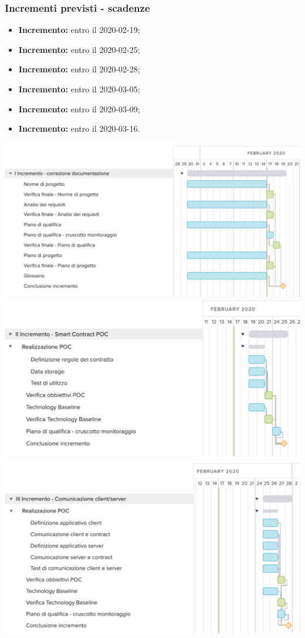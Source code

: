 \subsubsection{Incrementi previsti - scadenze}
\begin{itemize}
	\item \textbf{ Incremento:} entro il 2020-02-19;
	\item \textbf{ Incremento:} entro il 2020-02-25;
	\item \textbf{ Incremento:} entro il 2020-02-28;
	\item \textbf{ Incremento:} entro il 2020-03-05;
	\item \textbf{ Incremento:} entro il 2020-03-09;
	\item \textbf{ Incremento:} entro il 2020-03-16.
\end{itemize}
	\includegraphics[width=\textwidth]{res/img/gantt/RP/1}
	\includegraphics[width=\textwidth]{res/img/gantt/RP/2}
	\includegraphics[width=\textwidth]{res/img/gantt/RP/3}
